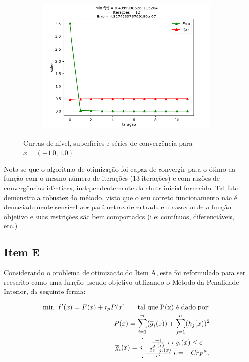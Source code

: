 \documentclass[a4paper, 12pt]{article}
\begin{document}
\begin{figure}[H]
\begin{subfigure}{0.3\textwidth}
  \includegraphics[width=\linewidth]{1/D/x-1x1/convergencia.png}
\end{subfigure}
\caption{Curvas de nível, superfícies e séries de convergência para $x = (-1.0, 1.0)$}
\label{fig:x-1x1}
\end{figure}

Nota-se que o algoritmo de otimização foi capaz de convergir para o ótimo da função com o mesmo número de iterações (13 iterações) e com razões de convergências idênticas, independentemente do chute inicial fornecido. Tal fato demonstra a robustez do método, visto que o seu correto funcionamento não é demasiadamente sensível aos parâmetros de entrada em casos onde a função objetivo e suas restrições são bem comportados (i.e: contínuos, diferenciáveis, etc.).

\subsection*{Item E}
Considerando o problema de otimização do Item A, este foi reformulado para ser reescrito como uma função pseudo-objetivo utilizando o Método da Penalidade Interior, da seguinte forma:


\begin{align*}
\begin{split}
\text{min\phantom{0}} f'(x) = F(x) + r_p P(x) \text{\phantom{000} tal que P(x) é dado por:} \\
P(x) = \sum_{i=1}^{m} (\overline g_i(x)) +  \sum_{j=1}^{n} (h_j(x))^2 \\
\overline g_i(x) = 
\left\{\begin{matrix}
\frac{-1}{g_i(x)} \leftrightarrow g_i(x) \leq  \epsilon  \\ 
\frac{-2 \epsilon - g_i(x)}{\epsilon^2} | \epsilon = -C {r_P}^a, 
\end{matrix}\right.
\end{split}
\end{align*}
\end{document}
